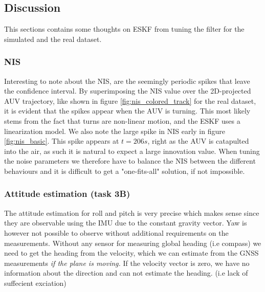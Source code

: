\subsection{Discussion}
This sections contains some thoughts on ESKF from tuning the filter for the simulated and the real dataset.



\subsubsection{NIS}
Interesting to note about the NIS, are the seemingly periodic spikes that leave the confidence interval. By superimposing the NIS value over the 2D-projected AUV trajectory, like shown in figure \ref{fig:nis_colored_track} for the real dataset, it is evident that the spikes appear when the AUV is turning. This most likely stems from the fact that turns are non-linear motion, and the ESKF uses a linearization model. We also note the large spike in NIS early in figure \ref{fig:nis_basic}. This spike appears at $t=206s$, right as the AUV is catapulted into the air, as such it is natural to expect a large innovation value. When tuning the noise parameters we therefore have to balance the NIS between the different behaviours and it is difficult to get a "one-fits-all" solution, if not impossible. 

\subsubsection{Attitude estimation (task 3B)}
The attitude estimation for roll and pitch is very precise which makes sense since they are observable using the IMU due to the constant gravity vector. Yaw is however not possible to observe without additional requirements on the measurements. Without any sensor for measuring global heading (i.e compass) we need to get the heading from the velocity, which we can estimate from the GNSS measurements \textit{if the plane is moving.} If the velocity vector is zero, we have no information about the direction and can not estimate the heading. (i.e lack of suffecient exciation) 

